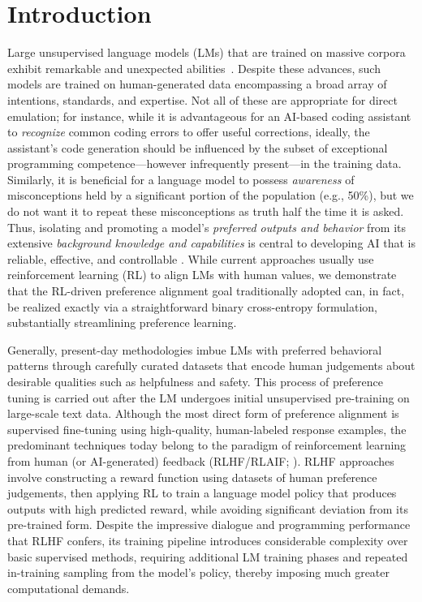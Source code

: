 \section{Introduction}
Large unsupervised language models (LMs) that are trained on massive corpora exhibit remarkable and unexpected abilities~\citep{chowdhery2022palm, brown2020language, touvron2023llama,bubeck2023sparks}. Despite these advances, such models are trained on human-generated data encompassing a broad array of intentions, standards, and expertise. Not all of these are appropriate for direct emulation; for instance, while it is advantageous for an AI-based coding assistant to \textit{recognize} common coding errors to offer useful corrections, ideally, the assistant's code generation should be influenced by the subset of exceptional programming competence—however infrequently present—in the training data. Similarly, it is beneficial for a language model to possess \textit{awareness} of misconceptions held by a significant portion of the population (e.g., 50\%), but we do not want it to repeat these misconceptions as truth half the time it is asked. Thus, isolating and promoting a model’s \emph{preferred outputs and behavior} from its extensive \textit{background knowledge and capabilities} is central to developing AI that is reliable, effective, and controllable \citep{ouyang2022training}. While current approaches usually use reinforcement learning (RL) to align LMs with human values, we demonstrate that the RL-driven preference alignment goal traditionally adopted can, in fact, be realized exactly via a straightforward binary cross-entropy formulation, substantially streamlining preference learning.

Generally, present-day methodologies imbue LMs with preferred behavioral patterns through carefully curated datasets that encode human judgements about desirable qualities such as helpfulness and safety. This process of preference tuning is carried out after the LM undergoes initial unsupervised pre-training on large-scale text data. Although the most direct form of preference alignment is supervised fine-tuning using high-quality, human-labeled response examples, the predominant techniques today belong to the paradigm of reinforcement learning from human (or AI-generated) feedback (RLHF/RLAIF; \citep{christiano2017deep,bai2022constitutional}). RLHF approaches involve constructing a reward function using datasets of human preference judgements, then applying RL to train a language model policy that produces outputs with high predicted reward, while avoiding significant deviation from its pre-trained form. Despite the impressive dialogue and programming performance that RLHF confers, its training pipeline introduces considerable complexity over basic supervised methods, requiring additional LM training phases and repeated in-training sampling from the model’s policy, thereby imposing much greater computational demands.

